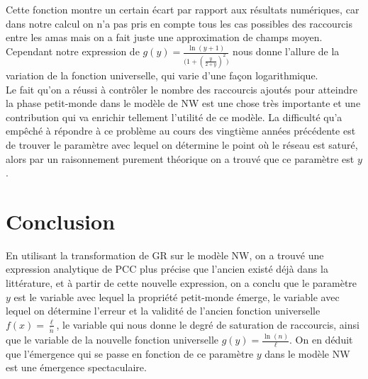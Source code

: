 Cette fonction montre un certain écart par rapport aux résultats numériques, car dans notre calcul on n'a pas pris en compte tous les cas possibles des raccourcis entre les \textsf{amas} mais on a fait juste une approximation de champs moyen. Cependant notre
expression de $g(y)=\frac{\ln(y+1)}{\big(1+(\frac{y}{2+y})^2\big)}$ nous donne l'allure de la variation de la fonction universelle, qui varie d'une façon logarithmique.\\
Le fait qu'on a réussi à contrôler le nombre des raccourcis ajoutés pour atteindre la phase petit-monde dans le modèle de NW est une chose très importante et une contribution qui va enrichir tellement l'utilité de ce modèle. La difficulté qu'a empêché à répondre à ce problème  au cours des vingtième années précédente est de trouver le paramètre avec lequel on détermine le point où le réseau est saturé, alors par un raisonnement purement théorique on a trouvé que ce paramètre est $y$. 
\section{Conclusion}

En utilisant la transformation de GR sur le modèle NW, on a trouvé une expression analytique de PCC plus précise que l'ancien existé déjà dans la littérature, et à partir de cette nouvelle expression, on a conclu  que le paramètre $y$ est le variable avec lequel la propriété petit-monde émerge, le variable avec lequel on détermine  l'erreur et la validité de l'ancien fonction universelle $f(x)=\frac{\ell}{\acute{n}}$, le variable qui nous donne le degré de saturation de raccourcis, ainsi que le variable de la nouvelle fonction universelle $g(y)=\frac{\ln(n)}{\ell}$. On en déduit que l'émergence qui se passe en fonction de ce paramètre $y$ dans le modèle NW est une émergence spectaculaire.